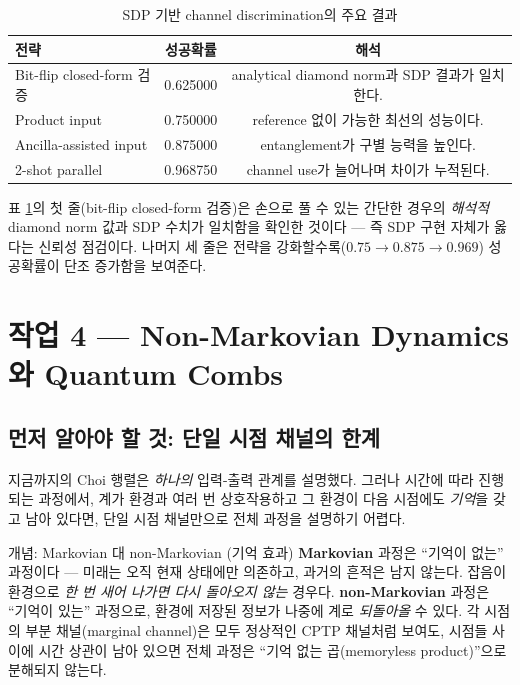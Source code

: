 \documentclass[11pt,a4paper]{article}
\begin{document}
\begin{table}[H]
\centering
\begin{tabular}{lcc}
\toprule
전략 & 성공확률 & 해석 \\
\midrule
Bit-flip closed-form 검증 & 0.625000 & analytical diamond norm과 SDP 결과가 일치한다. \\
Product input & 0.750000 & reference 없이 가능한 최선의 성능이다. \\
Ancilla-assisted input & 0.875000 & entanglement가 구별 능력을 높인다. \\
2-shot parallel & 0.968750 & channel use가 늘어나며 차이가 누적된다. \\
\bottomrule
\end{tabular}
\caption{SDP 기반 channel discrimination의 주요 결과}
\label{tab:sdp-results}
\end{table}

표 \ref{tab:sdp-results}의 첫 줄(bit-flip closed-form 검증)은 손으로 풀 수 있는 간단한 경우의 \emph{해석적} diamond norm 값과 SDP 수치가 일치함을 확인한 것이다 --- 즉 SDP 구현 자체가 옳다는 신뢰성 점검이다. 나머지 세 줄은 전략을 강화할수록($0.75\to0.875\to0.969$) 성공확률이 단조 증가함을 보여준다.

\section{작업 4 --- Non-Markovian Dynamics와 Quantum Combs}

\subsection{먼저 알아야 할 것: 단일 시점 채널의 한계}

지금까지의 Choi 행렬은 \emph{하나의} 입력-출력 관계를 설명했다. 그러나 시간에 따라 진행되는 과정에서, 계가 환경과 여러 번 상호작용하고 그 환경이 다음 시점에도 \emph{기억}을 갖고 남아 있다면, 단일 시점 채널만으로 전체 과정을 설명하기 어렵다.

\begin{conceptbox}{개념: Markovian 대 non-Markovian (기억 효과)}
\textbf{Markovian} 과정은 ``기억이 없는'' 과정이다 --- 미래는 오직 현재 상태에만 의존하고, 과거의 흔적은 남지 않는다. 잡음이 환경으로 \emph{한 번 새어 나가면 다시 돌아오지 않는} 경우다. \textbf{non-Markovian} 과정은 ``기억이 있는'' 과정으로, 환경에 저장된 정보가 나중에 계로 \emph{되돌아올} 수 있다. 각 시점의 부분 채널(marginal channel)은 모두 정상적인 CPTP 채널처럼 보여도, 시점들 사이에 시간 상관이 남아 있으면 전체 과정은 ``기억 없는 곱(memoryless product)''으로 분해되지 않는다.
\end{conceptbox}
\end{document}
